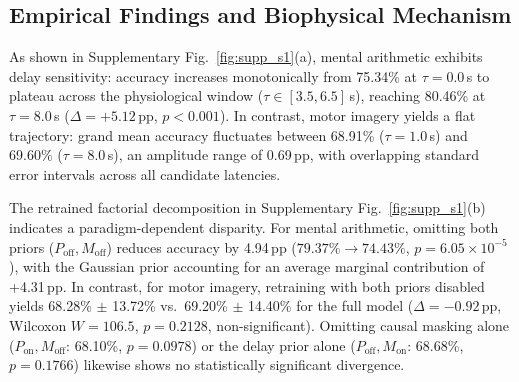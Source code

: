 \documentclass[journal]{IEEEtran}
\begin{document}
\subsection{Empirical Findings and Biophysical Mechanism}
As shown in Supplementary Fig.~\ref{fig:supp_s1}(a), mental arithmetic exhibits delay sensitivity: accuracy increases monotonically from 75.34\% at $\tau = 0.0$\,s to plateau across the physiological window ($\tau \in [3.5, 6.5]$\,s), reaching 80.46\% at $\tau = 8.0$\,s ($\Delta = +5.12$\,pp, $p < 0.001$). In contrast, motor imagery yields a flat trajectory: grand mean accuracy fluctuates between 68.91\% ($\tau = 1.0$\,s) and 69.60\% ($\tau = 8.0$\,s), an amplitude range of 0.69\,pp, with overlapping standard error intervals across all candidate latencies.

The retrained factorial decomposition in Supplementary Fig.~\ref{fig:supp_s1}(b) indicates a paradigm-dependent disparity. For mental arithmetic, omitting both priors ($P_{\mathrm{off}}, M_{\mathrm{off}}$) reduces accuracy by 4.94\,pp ($79.37\% \to 74.43\%$, $p = 6.05 \times 10^{-5}$), with the Gaussian prior accounting for an average marginal contribution of +4.31\,pp. In contrast, for motor imagery, retraining with both priors disabled yields 68.28\% $\pm$ 13.72\% vs.\ 69.20\% $\pm$ 14.40\% for the full model ($\Delta = -0.92$\,pp, Wilcoxon $W = 106.5$, $p = 0.2128$, non-significant). Omitting causal masking alone ($P_{\mathrm{on}}, M_{\mathrm{off}}$: 68.10\%, $p = 0.0978$) or the delay prior alone ($P_{\mathrm{off}}, M_{\mathrm{on}}$: 68.68\%, $p = 0.1766$) likewise shows no statistically significant divergence.
\end{document}
